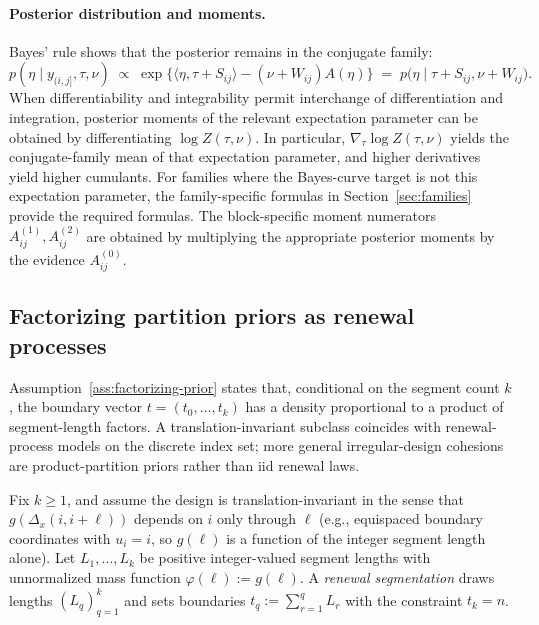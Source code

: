 \paragraph{Posterior distribution and moments.}
Bayes' rule shows that the posterior remains in the conjugate family:
\begin{equation}
 p(\eta\mid y_{(i,j]},\tau,\nu) \;\propto\; \exp\big\{\langle \eta,\tau+S_{ij}\rangle - (\nu+W_{ij})A(\eta)\big\}
 \;=\; p\big(\eta\mid \tau+S_{ij},\nu+W_{ij}\big).
 \label{eq:app-post}
\end{equation}
When differentiability and integrability permit interchange of differentiation and integration,
posterior moments of the relevant expectation parameter can be obtained by differentiating
$\log Z(\tau,\nu)$. In particular, $\nabla_{\tau}\log Z(\tau,\nu)$ yields the conjugate-family
mean of that expectation parameter, and higher derivatives yield higher cumulants. For families
where the Bayes-curve target is not this expectation parameter, the family-specific formulas in
Section~\ref{sec:families} provide the required formulas. The block-specific moment numerators
$A^{(1)}_{ij},A^{(2)}_{ij}$ are obtained by multiplying the appropriate posterior moments by the
evidence $A^{(0)}_{ij}$.

\subsection{Factorizing partition priors as renewal processes}
\label{app:renewal}

Assumption~\ref{ass:factorizing-prior} states that, conditional on the segment count $k$,
the boundary vector $t=(t_0,\dots,t_k)$ has a density proportional to a product of segment-length factors.
A translation-invariant subclass coincides with renewal-process models on the discrete index set;
more general irregular-design cohesions are product-partition priors rather than
iid renewal laws.

\begin{definition}
\label{def:renewal}
Fix $k\ge1$, and assume the design is translation-invariant in the sense that
$g(\Delta_x(i,i+\ell))$ depends on $i$ only through $\ell$ (e.g., equispaced boundary coordinates with
$u_i=i$, so $g(\ell)$ is a function of the integer segment length alone). Let $L_1,\dots,L_k$ be
positive integer-valued segment lengths with unnormalized mass function $\varphi(\ell):=g(\ell)$.
A \emph{renewal segmentation} draws lengths $(L_q)_{q=1}^k$ and sets boundaries
$t_q := \sum_{r=1}^q L_r$ with the constraint $t_k=n$.
\end{definition}

